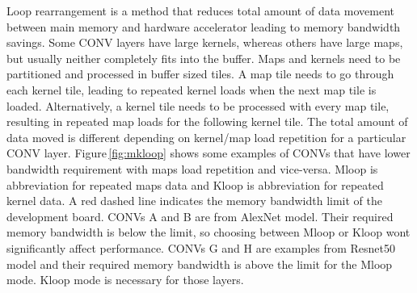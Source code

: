 \documentclass{sig-alternate}
\begin{document}
Loop rearrangement is a method that reduces total amount of data movement between main memory and hardware accelerator leading to memory bandwidth savings. Some CONV layers have large kernels, whereas others have large maps, but usually neither completely fits into the buffer. Maps and kernels need to be partitioned and processed in buffer sized tiles. A map tile needs to go through each kernel tile, leading to repeated kernel loads when the next map tile is loaded. Alternatively, a kernel tile needs to be processed with every map tile, resulting in repeated map loads for the following kernel tile. The total amount of data moved is different depending on kernel/map load repetition for a particular CONV layer. Figure\,\ref{fig:mkloop} shows some examples of CONVs that have lower bandwidth requirement with maps load repetition and vice-versa. Mloop is abbreviation for repeated maps data and Kloop is abbreviation for repeated kernel data. A red dashed line indicates the memory bandwidth limit of the development board. CONVs A and B are from AlexNet model. Their required memory bandwidth is below the limit, so choosing between Mloop or Kloop wont significantly affect performance. CONVs G and H are examples from Resnet50 model and their required memory bandwidth is above the limit for the Mloop mode. Kloop mode is necessary for those layers.


\end{document}
